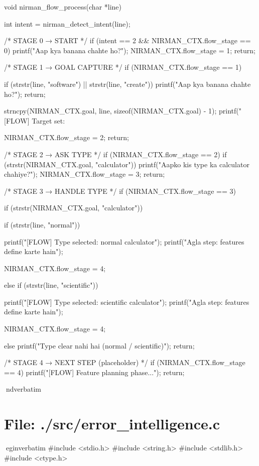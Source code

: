 \documentclass{article}
\begin{document}
void nirman_flow_process(char *line)
{
    int intent = nirman_detect_intent(line);

    /* STAGE 0 → START */
    if (intent == 2 && NIRMAN_CTX.flow_stage == 0)
    {
        printf("Aap kya banana chahte ho?\n");
        NIRMAN_CTX.flow_stage = 1;
        return;
    }

    /* STAGE 1 → GOAL CAPTURE */
    if (NIRMAN_CTX.flow_stage == 1)
    {
        if (strstr(line, "software") || strstr(line, "create"))
        {
            printf("Aap kya banana chahte ho?\n");
            return;
        }

        strncpy(NIRMAN_CTX.goal, line, sizeof(NIRMAN_CTX.goal) - 1);
        printf("[FLOW] Target set: %

        NIRMAN_CTX.flow_stage = 2;
        return;
    }

    /* STAGE 2 → ASK TYPE */
    if (NIRMAN_CTX.flow_stage == 2)
    {
        if (strstr(NIRMAN_CTX.goal, "calculator"))
        {
            printf("Aapko kis type ka calculator chahiye?\n");
            NIRMAN_CTX.flow_stage = 3;
            return;
        }
    }

    /* STAGE 3 → HANDLE TYPE */
    if (NIRMAN_CTX.flow_stage == 3)
    {
        if (strstr(NIRMAN_CTX.goal, "calculator"))
        {
            if (strstr(line, "normal"))
            {
                printf("[FLOW] Type selected: normal calculator\n");
                printf("Agla step: features define karte hain\n");

                NIRMAN_CTX.flow_stage = 4;
            }
            else if (strstr(line, "scientific"))
            {
                printf("[FLOW] Type selected: scientific calculator\n");
                printf("Agla step: features define karte hain\n");

                NIRMAN_CTX.flow_stage = 4;
            }
            else
            {
                printf("Type clear nahi hai (normal / scientific)\n");
            }
            return;
        }
    }

    /* STAGE 4 → NEXT STEP (placeholder) */
    if (NIRMAN_CTX.flow_stage == 4)
    {
        printf("[FLOW] Feature planning phase...\n");
        return;
    }
}
nd{verbatim}
\section*{File: ./src/error_intelligence.c}
egin{verbatim}
#include <stdio.h>
#include <string.h>
#include <stdlib.h>
#include <ctype.h>
\end{document}
